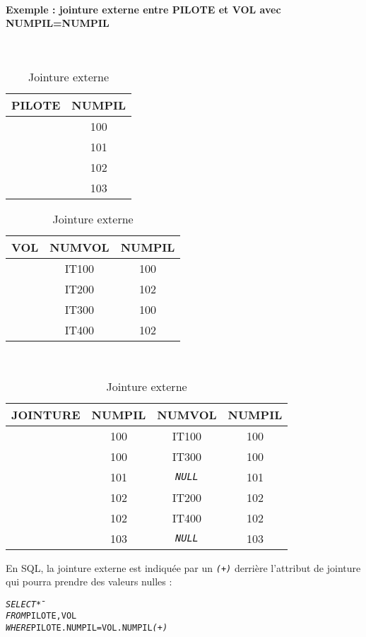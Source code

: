 \documentclass[10pt]{article}
\begin{document}
			\paragraph{Exemple : jointure externe entre PILOTE et VOL avec NUMPIL=NUMPIL}
			~\\
			\begin{table}[H]
				\begin{center}
					\begin{tabular}{|r|c|}
						\hline
						PILOTE 	& NUMPIL \\
						\hline
								& 100 \\
								& 101 \\
								& 102 \\
								& 103 \\
						\hline
					\end{tabular}
					\begin{tabular}{|r|c|c|}
						\hline
						VOL	& NUMVOL	& NUMPIL \\
						\hline
							& IT100		& 100 \\
							& IT200		& 102 \\
							& IT300		& 100 \\
							& IT400		& 102 \\
						\hline
					\end{tabular}
					
					~\\
					\begin{tabular}{|r|c|c|c|}
						\hline
						JOINTURE	& NUMPIL	& NUMVOL	& NUMPIL \\
						\hline
									& 100		& IT100		& 100 \\
									& 100		& IT300		& 100 \\
									& 101		& \emph{\texttt{NULL}} & 101 \\
									& 102		& IT200		& 102 \\
									& 102		& IT400		& 102 \\
									& 103		& \emph{\texttt{NULL}} & 103 \\
						\hline
					\end{tabular}
				\end{center}
				\caption{Jointure externe}
			\end{table}
			
			En SQL, la jointure externe est indiquée par un \emph{\texttt{(+)}} derrière l'attribut de jointure qui pourra prendre des valeurs nulles :\index{(+)}
			\begin{alltt}
				\begin{tabbing}
					\emph{SELECT} \= *\\
					\emph{FROM}	\> PILOTE,VOL \\
					\emph{WHERE} \> PILOTE.NUMPIL=VOL.NUMPIL\emph{(+)}
				\end{tabbing}
			\end{alltt}
			
\end{document}
